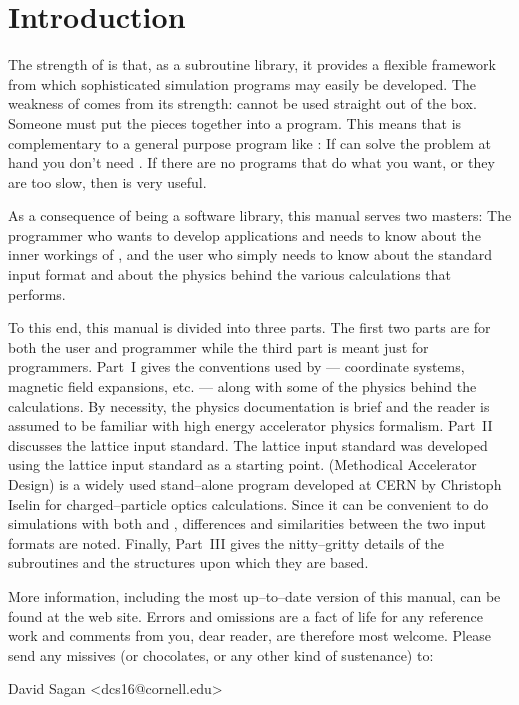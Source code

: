 \section*{Introduction}

The strength of \bmad is that, as a subroutine library, it provides a
flexible framework from which sophisticated simulation programs may
easily be developed.  The weakness of \bmad comes from its strength:
\bmad cannot be used straight out of the box. Someone must put the
pieces together into a program. This means that \bmad is
complementary to a general purpose program like
\mad\cite{b:maduser,b:madphysics}: If \mad can solve the problem at
hand you don't need \bmad. If there are no programs that do what you
want, or they are too slow, then \bmad is very useful.

As a consequence of \bmad being a software library, this manual serves
two masters: The programmer who wants to develop applications and
needs to know about the inner workings of \bmad, and the user who
simply needs to know about the \bmad standard input format and about
the physics behind the various calculations that \bmad performs.

To this end, this manual is divided into three parts. The first two
parts are for both the user and programmer while the third part is
meant just for programmers. Part~I gives the conventions used by
\bmad --- coordinate systems, magnetic field expansions, etc. ---
along with some of the physics behind the calculations. By necessity,
the physics documentation is brief and the reader is assumed to be familiar
with high energy accelerator physics formalism. Part~II discusses the
\bmad lattice input standard.  The \bmad lattice input standard was
developed using the \mad lattice input standard as a starting
point. \mad (Methodical Accelerator Design) is a widely used
stand--alone program developed at CERN by Christoph Iselin for
charged--particle optics calculations. Since it can be convenient
to do simulations with both \mad and \bmad, differences and
similarities between the two input formats are noted. 
Finally, Part~III gives the nitty--gritty details of the \bmad
subroutines and the structures upon which they are based.

More information, including the most up--to--date version of this
manual, can be found at the \bmad web site\cite{b:bmad.web}.
Errors and omissions are a fact of life for any reference work and
comments from you, dear reader, are therefore most welcome. Please
send any missives (or chocolates, or any other kind of sustenance) to:
\begin{example}
  David Sagan <dcs16@cornell.edu>
\end{example}

